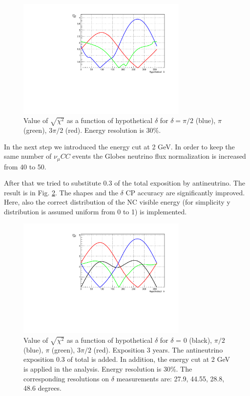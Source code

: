 \documentclass[prd,showpacs,groupedaddress,superscriptaddress,amsmath,amssymb]{revtex4-2} %
\begin{document}
\begin{figure}[h]
\begin{center}
\includegraphics[width=0.75\textwidth]{del.pdf}
\caption {Value of $\sqrt{\chi^2}$ as a function of hypothetical $\delta$ for $\delta = \pi/2$ (blue), $\pi$ (green), $3\pi/2$ (red). Energy resolution is 30\%.
\label{fig:del}}
\end{center} 
\end{figure}

 In the next step we introduced the energy cut at 2 GeV. In order to keep the same number of $\nu_{\mu}CC$ events the Globes neutrino flux normalization
is increased from 40 to 50.

 After that we tried to substitute 0.3 of the total exposition by antineutrino. The result is in Fig. \ref{fig:del_anu}. The shapes and the
$\delta$ CP accuracy are significantly improved. Here, also the correct distribution of the NC visible energy (for simplicity y distribution
is assumed uniform from 0 to 1) is implemented.

\begin{figure}[h]
\begin{center}
\includegraphics[width=0.75\textwidth]{del_anu.pdf}
\caption {Value of $\sqrt{\chi^2}$ as a function of hypothetical $\delta$ for $\delta$ = 0 (black), $\pi/2$ (blue), $\pi$ (green), $3\pi/2$ (red).
          Exposition 3 years.
          The antineutrino exposition 0.3 of total is added. In addition, the energy cut at 2 GeV is applied in the analysis. Energy resolution is 30\%.
          The corresponding resolutions on $\delta$ measurements are: 27.9, 44.55, 28.8, 48.6 degrees.
\label{fig:del_anu}}
\end{center}
\end{figure}
\end{document}
